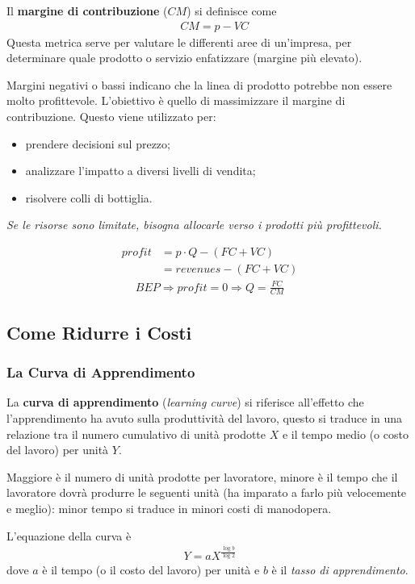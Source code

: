 \documentclass[a4paper,portrait,12pt]{article}
\theoremstyle{definition}
\begin{document}
Il \textbf{margine di contribuzione} ($CM$) si definisce come
\begin{align*}
&CM = p - VC
\end{align*}
Questa metrica serve per valutare le differenti aree di un'impresa, per determinare quale prodotto o servizio enfatizzare (margine più elevato).

Margini negativi o bassi indicano che la linea di prodotto potrebbe non essere molto profittevole.
L'obiettivo è quello di massimizzare il margine di contribuzione.
Questo viene utilizzato per:
\begin{itemize}
\item prendere decisioni sul prezzo;
\item analizzare l'impatto a diversi livelli di vendita;
\item risolvere colli di bottiglia.
\end{itemize}
\begin{center}
\emph{Se le risorse sono limitate, bisogna allocarle verso i prodotti più profittevoli.}
\end{center}
\begin{align*}
profit &= p \cdot Q - (FC + VC)\\
&= revenues - (FC + VC)
\end{align*}
\begin{gather*}
BEP \Rightarrow profit = 0 \Rightarrow Q = \frac{FC}{CM}
\end{gather*}

\subsection{Come Ridurre i Costi}

\subsubsection{La Curva di Apprendimento}
La \textbf{curva di apprendimento} (\emph{learning curve}) si riferisce all'effetto che l'apprendimento ha avuto sulla produttività del lavoro, questo si traduce in una relazione tra il numero cumulativo di unità prodotte $X$ e il tempo medio (o costo del lavoro) per unità $Y$.

Maggiore è il numero di unità prodotte per lavoratore, minore è il tempo che il lavoratore dovrà produrre le seguenti unità (ha imparato a farlo più velocemente e meglio): minor tempo si traduce in minori costi di manodopera.

L'equazione della curva è
\begin{align*}
Y = a X^{\frac{\log b}{\log 2}}
\end{align*}
dove $a$ è il tempo (o il costo del lavoro) per unità e $b$ è il \emph{tasso di apprendimento}.
\end{document}
